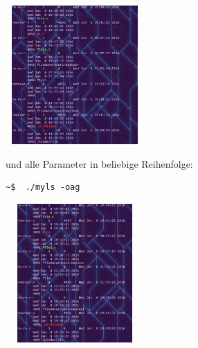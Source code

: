 \includegraphics[width=200px, height = 200px]{image/ausgabe-algo}

und alle Parameter in beliebige  Reihenfolge:
\begin{lstlisting}
~$	./myls -oag
\end{lstlisting}

\includegraphics[width=200px, height = 200px]{image/ausgabe-oag}
